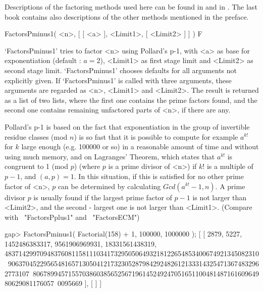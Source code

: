

Descriptions of the factoring methods used here can be found in
\cite{FactorizationAndPrimalityTesting} and in
\cite{ComputationalAlgebraicNumberTheory}.
The last book contains also descriptions of the other methods mentioned
in the preface.

 
\>FactorsPminus1( <n>, [ [ <a> ], <Limit1>, [ <Limit2> ] ] ) F

`FactorsPminus1' tries to factor <n> using Pollard's p-1, with <a>
as base for exponentiation (default : $a=2$), 
<Limit1> as first stage limit and <Limit2> as second stage limit.
`FactorsPminus1' chooses defaults for all arguments not explicitly given.
If `FactorsPminus1' is called with three arguments, these arguments
are regarded as <n>, <Limit1> and <Limit2>.
The result is returned as a list of two lists, where the first one 
contains the prime factors found, and the second one contains
remaining unfactored parts of <n>, if there are any.

Pollard's p-1 is based on the fact that exponentiation in the
group of invertible residue classes (mod $n$) is so fast that
it is possible to compute for example $a^{k!}$ for $k$ large enough
(e.g. 100000 or so) in a reasonable amount of time and without
using much memory, and on Lagranges' Theorem,
which states that $a^{k!}$ is congruent to 1 (mod $p$) 
(where $p$ is a prime divisor of <n>) if $k!$ is a multiple of $p-1$,
and $(a,p)=1$.
In this situation, if this is satisfied for no other
prime factor of <n>, $p$ can be determined by 
calculating $Gcd(a^{k!}-1,n)$.
A prime divisor $p$ is usually found if the largest prime factor
of $p-1$ is not larger than <Limit2>, and the second - largest one
is not larger than <Limit1>.
(Compare with ~"FactorsPplus1" and ~"FactorsECM")

\beginexample
gap> FactorsPminus1( Factorial(158) + 1, 100000, 1000000 );
[ [ 2879, 5227, 1452486383317, 9561906969931, 18331561438319, 
      483714299709483760811581110341732950506493218122654853400674921345082310\
906370452295654816571305041217323052879842924826121333143254713674832962773107\
806789945715570386038565256719614524924705165110048148716160964980629081176057\
0095669 ], [  ] ]

